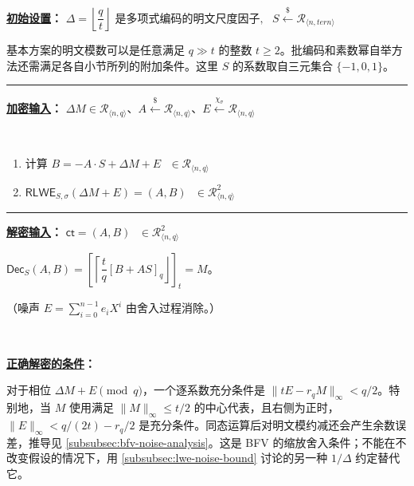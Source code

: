 \begin{tcolorbox}[title={\textbf{\tboxlabel{\ref*{subsec:bfv-enc-dec}} BFV 加密与解密}}]

\textbf{\underline{初始设置}：} $\Delta=\left\lfloor\dfrac{q}{t}\right\rfloor \text{ 是多项式编码的明文尺度因子}, \text{ } S \xleftarrow{\$} \mathcal{R}_{\langle n, \textit{tern} \rangle}$

基本方案的明文模数可以是任意满足 $q\gg t$ 的整数 $t\geq2$。批编码和素数幂自举方法还需满足各自小节所列的附加条件。这里 $S$ 的系数取自三元集合 $\{-1,0,1\}$。

\par\noindent\rule{\textwidth}{0.4pt}

\textbf{\underline{加密输入}：} $\Delta M \in \mathcal{R}_{\langle n, q \rangle}$、$A \xleftarrow{\$} \mathcal{R}_{\langle n, q \rangle}$、$E \xleftarrow{\chi_\sigma} \mathcal{R}_{\langle n, q \rangle}$


$ $

\begin{enumerate}


\item 计算 $B = -A \cdot S + \Delta M + E \text{ } \in \mathcal{R}_{\langle n,q \rangle}$

\item $\textsf{RLWE}_{S,\sigma}(\Delta M + E) = (A, B) \text{ } \in \mathcal{R}_{\langle n,q \rangle}^2$ 

\end{enumerate}

\par\noindent\rule{\textwidth}{0.4pt}

\textbf{\underline{解密输入}：} $\textsf{ct} = (A, B) \text{ } \in \mathcal{R}_{\langle n,q \rangle}^2$

$\textsf{Dec}_S(A,B)=\left[\left\lceil\dfrac{t}{q}[B+AS]_q\right\rfloor\right]_t=M$。

（噪声 $E = \sum\limits_{i=0}^{n-1}e_iX^i$ 由舍入过程消除。）



$ $

\textbf{\underline{正确解密的条件}：}

对于相位 $\Delta M+E\pmod q$，一个逐系数充分条件是 $\|tE-r_qM\|_\infty<q/2$。特别地，当 $M$ 使用满足 $\|M\|_\infty\leq t/2$ 的中心代表，且右侧为正时，$\|E\|_\infty<q/(2t)-r_q/2$ 是充分条件。同态运算后对明文模约减还会产生余数误差，推导见 \autoref{subsubsec:bfv-noise-analysis}。这是 BFV 的缩放舍入条件；不能在不改变假设的情况下，用 \autoref{subsubsec:lwe-noise-bound} 讨论的另一种 $1/\Delta$ 约定替代它。

\end{tcolorbox}


